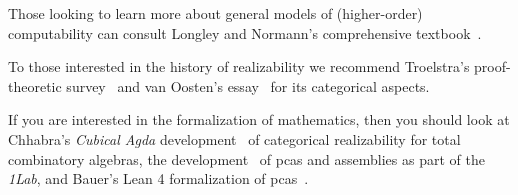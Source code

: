 Those looking to learn more about general models of (higher-order) computability
can consult Longley and Normann's comprehensive
textbook~\cite{LongleyNormann2015}.

To those interested in the history of realizability we recommend Troelstra's
proof-theoretic survey~\cite{Troelstra1998} and van Oosten's
essay~\cite{vanOosten2002} for its categorical aspects.

If you are interested in the formalization of mathematics, then you should look
at Chhabra's \emph{Cubical Agda} development~\cite{Chhabra2023} of categorical
realizability for total combinatory algebras, the development~\cite{1Lab2025}
of pcas and assemblies as part of the \emph{1Lab}, and Bauer's Lean 4
formalization of pcas~\cite{Bauer2024}.


